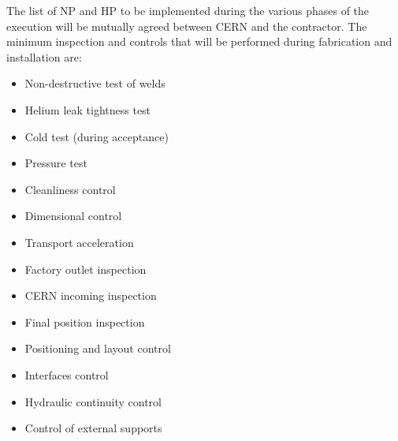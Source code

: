 The list of NP and HP to be implemented during the various phases of the execution will be mutually agreed between CERN and the contractor. The minimum inspection and controls that will be performed during fabrication and installation are:

\begin{itemize}
\item Non-destructive test of welds
\item Helium leak tightness test
\item Cold test (during acceptance)
\item Pressure test
\item Cleanliness control
\item Dimensional control
\item Transport acceleration
\item Factory outlet inspection
\item CERN incoming inspection
\item Final position inspection
\item Positioning and layout control
\item Interfaces control
\item Hydraulic continuity control
\item Control of external supports
\end{itemize}

